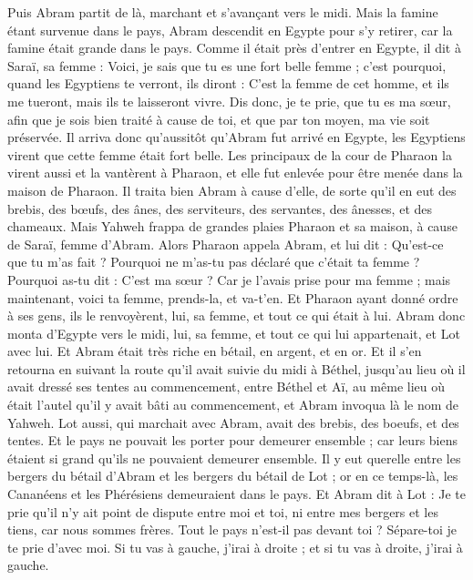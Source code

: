 \begin{multicols}{2}
Puis Abram partit de là, marchant et s'avançant vers le midi.
Mais la famine étant survenue dans le pays, Abram descendit en Egypte pour s'y retirer, car la famine était grande dans le pays.
Comme il était près d'entrer en Egypte, il dit à Saraï, sa femme : Voici, je sais que tu es une fort belle femme ;
c'est pourquoi, quand les Egyptiens te verront, ils diront : C'est la femme de cet homme, et ils me tueront, mais ils te laisseront vivre.
Dis donc, je te prie, que tu es ma sœur, afin que je sois bien traité à cause de toi, et que par ton moyen, ma vie soit préservée.
Il arriva donc qu'aussitôt qu'Abram fut arrivé en Egypte, les Egyptiens virent que cette femme était fort belle.
Les principaux de la cour de Pharaon la virent aussi et la vantèrent à Pharaon, et elle fut enlevée pour être menée dans la maison de Pharaon.
Il traita bien Abram à cause d'elle, de sorte qu'il en eut des brebis, des bœufs, des ânes, des serviteurs, des servantes, des ânesses, et des chameaux.
Mais Yahweh frappa de grandes plaies Pharaon et sa maison, à cause de Saraï, femme d'Abram.
Alors Pharaon appela Abram, et lui dit : Qu'est-ce que tu m'as fait ? Pourquoi ne m'as-tu pas déclaré que c'était ta femme ?
Pourquoi as-tu dit : C'est ma sœur ? Car je l'avais prise pour ma femme ; mais maintenant, voici ta femme, prends-la, et va-t'en.
Et Pharaon ayant donné ordre à ses gens, ils le renvoyèrent, lui, sa femme, et tout ce qui était à lui.
\VerseOne{}Abram donc monta d'Egypte vers le midi, lui, sa femme, et tout ce qui lui appartenait, et Lot avec lui.
Et Abram était très riche en bétail, en argent, et en or.
Et il s'en retourna en suivant la route qu'il avait suivie du midi à Béthel, jusqu'au lieu où il avait dressé ses tentes au commencement, entre Béthel et Aï,
au même lieu où était l'autel qu'il y avait bâti au commencement, et Abram invoqua là le nom de Yahweh.
Lot aussi, qui marchait avec Abram, avait des brebis, des boeufs, et des tentes.
Et le pays ne pouvait les porter pour demeurer ensemble ; car leurs biens étaient si grand qu'ils ne pouvaient demeurer ensemble.
Il y eut querelle entre les bergers du bétail d'Abram et les bergers du bétail de Lot ; or en ce temps-là, les Cananéens et les Phérésiens demeuraient dans le pays.
Et Abram dit à Lot : Je te prie qu'il n'y ait point de dispute entre moi et toi, ni entre mes bergers et les tiens, car nous sommes frères.
Tout le pays n'est-il pas devant toi ? Sépare-toi je te prie d'avec moi. Si tu vas à gauche, j’irai à droite ; et si tu vas à droite, j’irai à gauche.

\end{multicols}
